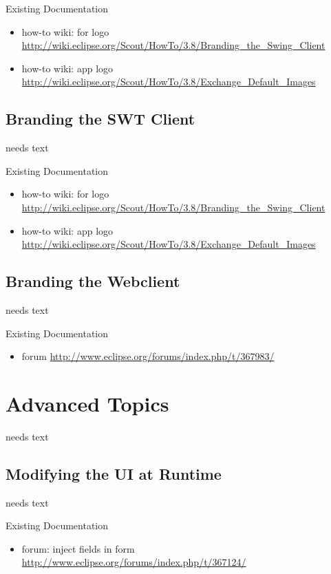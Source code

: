 \documentclass[a4paper,10pt,twoside]{book}
\begin{document}
\noindent Existing Documentation
\begin{itemize}
  \item how-to wiki: for logo \url{http://wiki.eclipse.org/Scout/HowTo/3.8/Branding_the_Swing_Client}
  \item how-to wiki: app logo \url{http://wiki.eclipse.org/Scout/HowTo/3.8/Exchange_Default_Images}
\end{itemize}

\section{Branding the SWT Client}
needs text

\noindent Existing Documentation
\begin{itemize}
  \item how-to wiki: for logo \url{http://wiki.eclipse.org/Scout/HowTo/3.8/Branding_the_Swing_Client}
  \item how-to wiki: app logo \url{http://wiki.eclipse.org/Scout/HowTo/3.8/Exchange_Default_Images}
\end{itemize}

\section{Branding the Webclient}
needs text

\noindent Existing Documentation
\begin{itemize}
  \item forum \url{http://www.eclipse.org/forums/index.php/t/367983/}
\end{itemize}

\chapter{Advanced Topics}
needs text  

\section{Modifying the UI at Runtime}
needs text

\noindent Existing Documentation
\begin{itemize}
  \item forum: inject fields in form \url{http://www.eclipse.org/forums/index.php/t/367124/}
\end{itemize}
\end{document}
